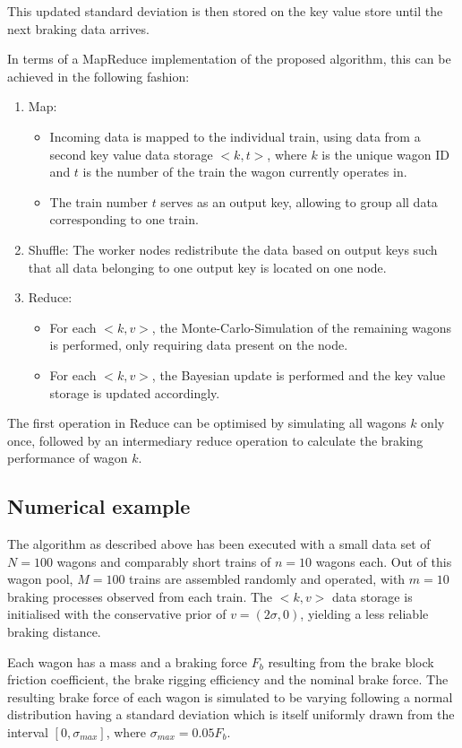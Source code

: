 \documentclass[a4paper, 12pt]{scrartcl}
\begin{document}
This updated standard deviation is then stored on the key value store until the next braking data arrives.

In terms of a MapReduce implementation of the proposed algorithm, this can be achieved in the following fashion:
\begin{enumerate}
	\item Map: 
	\begin{itemize}
		\item Incoming data is mapped to the individual train, using data from a second key value data storage $<k, t>$, where $k$ is the unique wagon ID and $t$ is the number of the train the wagon currently operates in.
		\item The train number $t$ serves as an output key, allowing to group all data corresponding to one train.
		\end{itemize}
	\item Shuffle: The worker nodes redistribute the data based on output keys such that all data belonging to one output key is located on one node.
	\item Reduce: 
	\begin{itemize}
		\item For each $<k, v>$, the Monte-Carlo-Simulation of the remaining wagons is performed, only requiring data present on the node.
		\item For each $<k, v>$, the Bayesian update is performed and the key value storage is updated accordingly.
		\end{itemize}
\end{enumerate}
The first operation in Reduce can be optimised by simulating all wagons $k$ only once, followed by an intermediary reduce operation to calculate the braking performance of wagon $k$.

\subsection{Numerical example}
The algorithm as described above has been executed with a small data set of $N = 100$ wagons and comparably short trains of $n = 10$ wagons each. Out of this wagon pool, $M = 100$ trains are assembled randomly and operated, with $m = 10$ braking processes observed from each train. The $<k,v>$ data storage is initialised with the conservative prior of $v = \left(2 \sigma, 0\right)$, yielding a less reliable braking distance.

Each wagon has a mass and a braking force $F_{b}$ resulting from the brake block friction coefficient, the brake rigging efficiency and the nominal brake force. The resulting brake force of each wagon is simulated to be varying following a normal distribution having a standard deviation which is itself uniformly drawn from the interval $\left[0, \sigma_{max}\right]$, where $\sigma_{max} = 0.05 F_{b}$.
\end{document}
